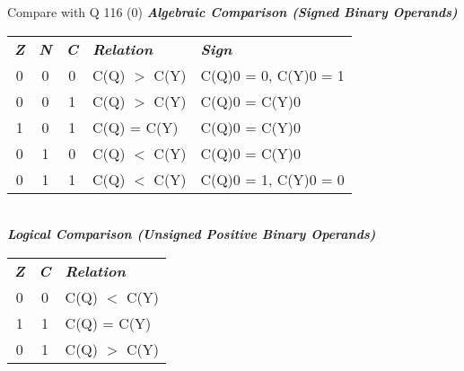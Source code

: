 { {Compare with Q} {116 (0)}
\inbif
{}
\inall
\inina
{}
\textbf{\textsl{Algebraic Comparison (Signed Binary Operands)}}\\
\begin{tabular}{c c c l l}
\textit{\textbf{Z}} & 
\textit{\textbf{N}} & 
\textit{\textbf{C}} & 
\textit{\textbf{Relation}} & 
\textit{\textbf{Sign}} \\
0 & 0 & 0 & C(Q) $>$ C(Y) & C(Q)0 = 0, C(Y)0 = 1 \\
0 & 0 & 1 & C(Q) $>$ C(Y) & C(Q)0 = C(Y)0 \\
1 & 0 & 1 & C(Q) = C(Y) & C(Q)0 = C(Y)0 \\
0 & 1 & 0 & C(Q) $<$ C(Y) & C(Q)0 = C(Y)0 \\
0 & 1 & 1 & C(Q) $<$ C(Y) & C(Q)0 = 1, C(Y)0 = 0 \\
\end{tabular} \\
\textbf{\textsl{Logical Comparison (Unsigned Positive Binary Operands)}}\\
\begin{tabular}{c c l}
\textit{\textbf{Z}} & 
\textit{\textbf{C}} & 
\textit{\textbf{Relation}} \\
0 & 0 & C(Q) $<$ C(Y) \\
1 & 1 & C(Q) = C(Y) \\
0 & 1 & C(Q) $>$ C(Y) \\
\end{tabular}








}
